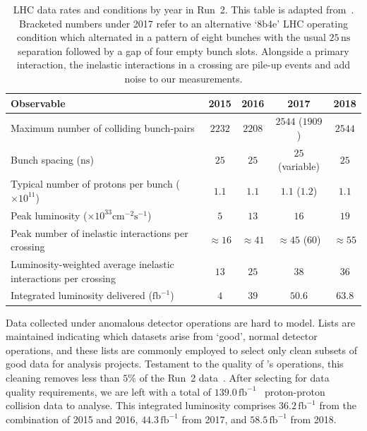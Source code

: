 \begin{table}
\centering
\begin{tabular}{lcccc}
Observable                                                        & 2015         & 2016         & 2017                & 2018         \\
\hline
Maximum number of colliding bunch-pairs                           & $2232$       & $2208$       & $2544$ ($1909$)     & $2544$       \\
Bunch spacing ($\mathrm{ns}$)                                     & $25$         & $25$         & $25$ (variable)     & $25$         \\
Typical number of protons per bunch ($\times 10^{11}$)            & $1.1$        & $1.1$        & $1.1$ ($1.2$)       & $1.1$        \\
Peak luminosity ($\times 10^{33}\mathrm{cm}^{-2}\mathrm{s}^{-1}$) & $5$          & $13$         & $16$                & $19$         \\
Peak number of inelastic interactions per crossing                & $\approx 16$ & $\approx 41$ & $\approx 45$ ($60$) & $\approx 55$ \\
Luminosity-weighted average inelastic interactions per crossing   & $13$         & $25$         & $38$                & $36$         \\
Integrated luminosity delivered ($\mathrm{fb}^{-1}$)              & $4$          & $39$         & $50.6$              & $63.8$
\end{tabular}
\caption[
LHC data rates and conditions by year in Run~2
]{%
LHC data rates and conditions by year in Run~2.
This table is adapted from~\cite{ATLAS:2022hro}.
Bracketed numbers under 2017 refer to an alternative `8b4e' LHC operating
condition which alternated in a pattern of eight bunches with the usual
$25\,\mathrm{ns}$ separation followed by a gap of four empty bunch slots.
Alongside a primary interaction, the inelastic interactions in a crossing are
pile-up events and add noise to our measurements.
}
\label{tab:experiment_run2_state}
\end{table}

Data collected under anomalous detector operations are hard to model.
Lists are maintained indicating which datasets arise from `good', normal
detector operations, and these lists are commonly employed to select only clean
subsets of good data for analysis projects.
Testament to the quality of \atlas's operations, this cleaning removes less
than $5\%$ of the Run~2 data~\cite{
DAPR-2018-01,
Golling:2011zy
}.
After selecting for data quality requirements, we are left with a total of
$139.0\,\mathrm{fb}^{-1}$ \atlas\ proton-proton collision data to analyse.
This integrated luminosity comprises
$36.2\,\mathrm{fb}^{-1}$ from the combination of 2015 and 2016,
$44.3\,\mathrm{fb}^{-1}$ from 2017, and
$58.5\,\mathrm{fb}^{-1}$ from 2018.


